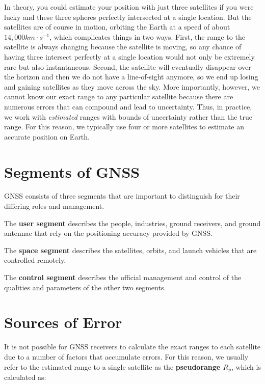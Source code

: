\documentclass[
]{book}
\begin{document}
In theory, you could estimate your position with just three satellites if you were lucky and these three spheres perfectly intersected at a single location. But the satellites are of course in motion, orbiting the Earth at a speed of about \(14,000 km·s^{-1}\), which complicates things in two ways. First, the range to the satellite is always changing because the satellite is moving, so any chance of having three intersect perfectly at a single location would not only be extremely rare but also instantaneous. Second, the satellite will eventually disappear over the horizon and then we do not have a line-of-sight anymore, so we end up losing and gaining satellites as they move across the sky. More importantly, however, we cannot know our exact range to any particular satellite because there are numerous errors that can compound and lead to uncertainty. Thus, in practice, we work with \emph{estimated} ranges with bounds of uncertainty rather than the true range. For this reason, we typically use four or more satellites to estimate an accurate position on Earth.

\section{Segments of GNSS}\label{segments-of-gnss}

GNSS consists of three segments that are important to distinguish for their differing roles and management.

The \textbf{user segment} describes the people, industries, ground receivers, and ground antennae that rely on the positioning accuracy provided by GNSS.

The \textbf{space segment} describes the satellites, orbits, and launch vehicles that are controlled remotely.

The \textbf{control segment} describes the official management and control of the qualities and parameters of the other two segments.

\section{Sources of Error}\label{sources-of-error}

It is not possible for GNSS receivers to calculate the exact ranges to each satellite due to a number of factors that accumulate errors. For this reason, we usually refer to the estimated range to a single satellite as the \textbf{pseudorange \(R_p\)}, which is calculated as:
\end{document}
